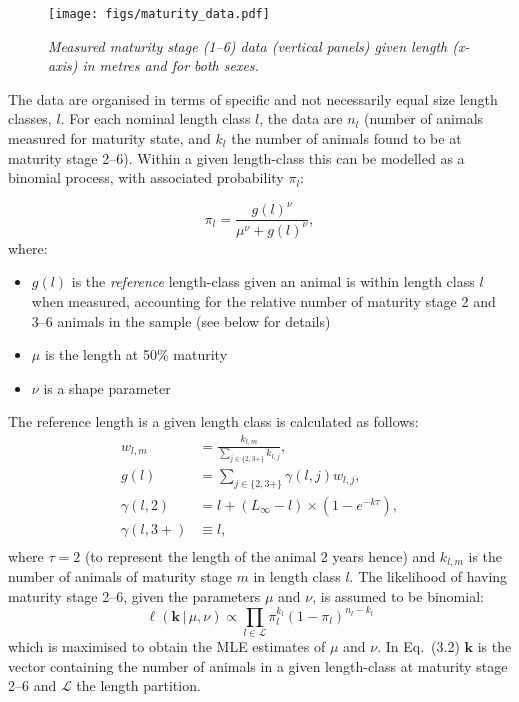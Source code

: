 \documentclass[12pt,a4paper,twoside,times,blue,standard]{csiroreport2017}
\newcommand{\ds}{\displaystyle}
\begin{document}
\begin{figure}[h]
    \begin{center}
        \texttt{[image: figs/maturity\_data.pdf]}
    \end{center}
    \caption{\textit{Measured maturity stage (1--6) data (vertical panels) given length (x-axis) in metres and for both sexes.}}
\end{figure}

The data are organised in terms of specific and not necessarily equal size length classes, $l$. For each nominal length class $l$, the data are $n_l$ (number of animals measured for maturity state, and $k_l$ the number of animals found to be at maturity stage 2--6). Within a given length-class this can be modelled as a binomial process, with associated probability $\pi_l$:

\begin{equation}
\ds \pi_l = \frac{g(l)^\nu}{\mu^\nu+g(l)^\nu},
\end{equation}
where:

\begin{itemize}
    \item $g(l)$ is the \emph{reference} length-class given an animal is within length class $l$ when measured, accounting for the relative number of maturity stage 2 and 3--6 animals in the sample (see below for details)
    \item $\mu$ is the length at 50\% maturity
    \item $\nu$ is a shape parameter
\end{itemize}

The reference length is a given length class is calculated as follows:
\begin{align*}
    \ds w_{l,m} &= \frac{k_{l,m}}{\sum\limits_{j\in\{2,3+\}} k_{l,j}},\\
    \ds g(l) &= \sum\limits_{j\in\{2,3+\}}\gamma(l,j)w_{l,j},\\
    \ds \gamma(l,2) &= l+\left(L_\infty-l\right)\times\left(1-e^{-k\tau}\right),\\
    \ds \gamma(l,3+) &\equiv l,\\
\end{align*}
where $\tau=2$ (to represent the length of the animal 2 years hence) and $k_{l,m}$ is the number of animals of maturity stage $m$ in length class $l$. The likelihood of having maturity stage 2--6, given the parameters $\mu$ and $\nu$, is assumed to be binomial:
\begin{equation}
    \ds \ell\left(\mathbf{k}\,|\,\mu,\nu\right) \propto \prod_{l\in\mathcal{L}}\pi_l^{k_l}\left(1-\pi_l\right)^{n_l-k_l}
\end{equation}
which is maximised to obtain the MLE estimates of $\mu$ and $\nu$. In Eq.~(3.2) $\mathbf{k}$ is the vector containing the number of animals in a given length-class at maturity stage 2--6 and $\mathcal{L}$ the length partition.
\end{document}
